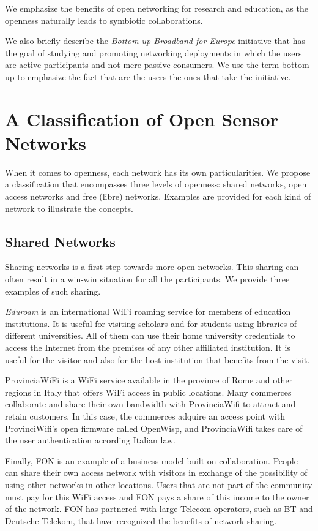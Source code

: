 \documentclass[journal]{IEEEtran}
\begin{document}
We emphasize the benefits of open networking for research and education, as the openness naturally leads to symbiotic collaborations.

We also briefly describe the \emph{Bottom-up Broadband for Europe} initiative that has the goal of studying and promoting networking deployments in which the users are active participants and not mere passive consumers.
We use the term bottom-up to emphasize the fact that are the users the ones that take the initiative.


\section{A Classification of Open Sensor Networks}

When it comes to openness, each network has its own particularities.
We propose a classification that encompasses three levels of openness: shared networks, open access networks and free (libre) networks.
Examples are provided for each kind of network to illustrate the concepts.

\subsection{Shared Networks}

Sharing networks is a first step towards more open networks.
This sharing can often result in a win-win situation for all the participants.
We provide three examples of such sharing.

\emph{Eduroam} is an international WiFi roaming service for members of education institutions.
It is useful for visiting scholars and for students using libraries of different universities.
All of them can use their home university credentials to access the Internet from the premises of any other affiliated institution.
It is useful for the visitor and also for the host institution that benefits from the visit.

ProvinciaWiFi is a WiFi service available in the province of Rome and other regions in Italy that offers WiFi access in public locations.
Many commerces collaborate and share their own bandwidth with ProvinciaWifi to attract and retain customers.
In this case, the commerces adquire an access point with ProvinciWifi's open firmware called OpenWisp, and ProvinciaWifi takes care of the user authentication according Italian law.

Finally, FON is an example of a business model built on collaboration.
People can share their own access network with visitors in exchange of the possibility of using other networks in other locations.
Users that are not part of the community must pay for this WiFi access and FON pays a share of this income to the owner of the network.
FON has partnered with large Telecom operators, such as BT and Deutsche Telekom, that have recognized the benefits of network sharing.
\end{document}
